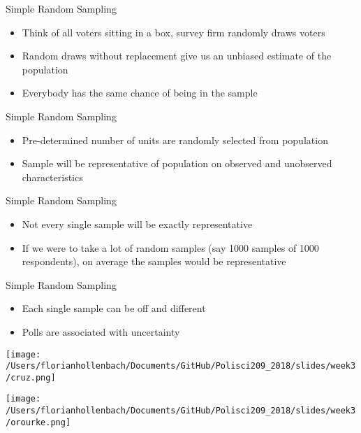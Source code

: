 \documentclass[presentation]{beamer}
\begin{document}
\begin{frame}[label={sec:orgc7e3a52}]{Simple Random Sampling}
\begin{itemize}
\item Think of all voters sitting in a box, survey firm randomly draws voters

\item Random draws without replacement give us an unbiased estimate of the population

\item Everybody has the same chance of being in the sample
\end{itemize}
\end{frame}


\begin{frame}[label={sec:org07b56ce}]{Simple Random Sampling}
\begin{itemize}
\item Pre-determined number of units are randomly selected from population

\item Sample will be representative of population on observed and unobserved characteristics
\end{itemize}
\end{frame}



\begin{frame}[label={sec:org883ee83}]{Simple Random Sampling}
\begin{itemize}
\item Not every single sample will be exactly representative

\item If we were to take a lot of random samples (say 1000 samples of 1000 respondents), on average the samples would be representative
\end{itemize}
\end{frame}

\begin{frame}[label={sec:orgbed0acd}]{Simple Random Sampling}
\begin{itemize}
\item Each single sample can be off and different

\item Polls are associated with uncertainty
\end{itemize}

\begin{center}
\texttt{[image: /Users/florianhollenbach/Documents/GitHub/Polisci209\_2018/slides/week3/cruz.png]}
\end{center}

\pause


\begin{center}
\texttt{[image: /Users/florianhollenbach/Documents/GitHub/Polisci209\_2018/slides/week3/orourke.png]}
\end{center}
\end{frame}
\end{document}

